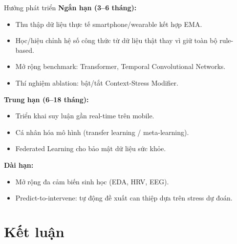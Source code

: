 \documentclass[11pt]{beamer}
\begin{document}
\begin{frame}{Hướng phát triển}
\small
\textbf{Ngắn hạn (3--6 tháng):}
\begin{itemize}
    \item Thu thập dữ liệu thực tế smartphone/wearable kết hợp EMA.
    \item Học/hiệu chỉnh hệ số công thức từ dữ liệu thật thay vì giữ toàn bộ rule-based.
    \item Mở rộng benchmark: Transformer, Temporal Convolutional Networks.
    \item Thí nghiệm ablation: bật/tắt Context-Stress Modifier.
\end{itemize}

\textbf{Trung hạn (6--18 tháng):}
\begin{itemize}
    \item Triển khai suy luận gần real-time trên mobile.
    \item Cá nhân hóa mô hình (transfer learning / meta-learning).
    \item Federated Learning cho bảo mật dữ liệu sức khỏe.
\end{itemize}

\textbf{Dài hạn:}
\begin{itemize}
    \item Mở rộng đa cảm biến sinh học (EDA, HRV, EEG).
    \item Predict-to-intervene: tự động đề xuất can thiệp dựa trên stress dự đoán.
\end{itemize}
\end{frame}

\section{Kết luận}
\end{document}
